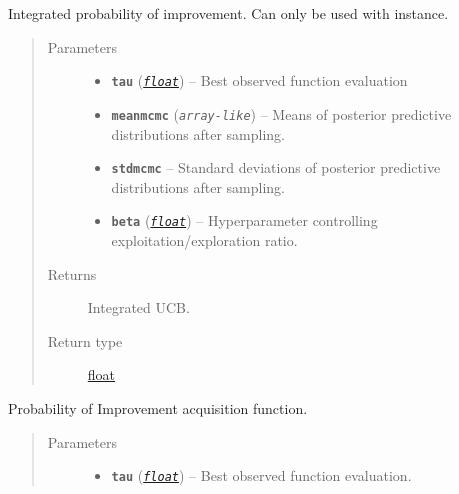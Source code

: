 \documentclass[letterpaper,10pt,english]{sphinxmanual}
\begin{document}
\begin{fulllineitems}

\begin{fulllineitems}
\label{pyGPGO.acquisition:pyGPGO.acquisition.Acquisition.IntegratedUCB}
Integrated probability of improvement. Can only be used with  instance.
\begin{quote}\begin{description}
\item[{Parameters}] \leavevmode\begin{itemize}
\item {} 
\textbf{\texttt{tau}} (\href{https://docs.python.org/2/library/functions.html\#float}{\emph{\texttt{float}}}) -- Best observed function evaluation

\item {} 
\textbf{\texttt{meanmcmc}} (\emph{\texttt{array-like}}) -- Means of posterior predictive distributions after sampling.

\item {} 
\textbf{\texttt{stdmcmc}} -- Standard deviations of posterior predictive distributions after sampling.

\item {} 
\textbf{\texttt{beta}} (\href{https://docs.python.org/2/library/functions.html\#float}{\emph{\texttt{float}}}) -- Hyperparameter controlling exploitation/exploration ratio.

\end{itemize}

\item[{Returns}] \leavevmode
Integrated UCB.

\item[{Return type}] \leavevmode
\href{https://docs.python.org/2/library/functions.html\#float}{float}

\end{description}\end{quote}

\end{fulllineitems}


\begin{fulllineitems}
\label{pyGPGO.acquisition:pyGPGO.acquisition.Acquisition.ProbabilityImprovement}
Probability of Improvement acquisition function.
\begin{quote}\begin{description}
\item[{Parameters}] \leavevmode\begin{itemize}
\item {} 
\textbf{\texttt{tau}} (\href{https://docs.python.org/2/library/functions.html\#float}{\emph{\texttt{float}}}) -- Best observed function evaluation.


\end{itemize}
\end{description}
\end{quote}
\end{fulllineitems}
\end{fulllineitems}
\end{document}
